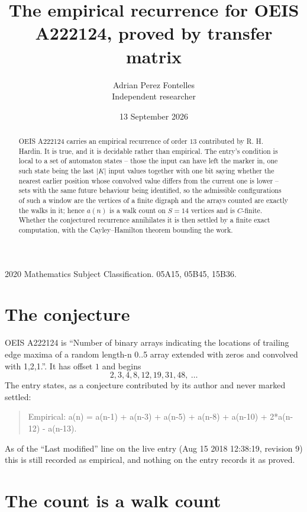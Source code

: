 \documentclass[11pt,a4paper]{article}
\title{The empirical recurrence for OEIS A222124, proved by transfer matrix}
\author{Adrian Perez Fontelles\\ \small Independent researcher}
\date{13 September 2026}
\theoremstyle{plain}
\theoremstyle{definition}
\begin{document}
\maketitle

\begin{abstract}
OEIS A222124 carries an empirical recurrence of order $13$ contributed by R. H. Hardin. It is
true, and it is decidable rather than empirical. The entry's condition is local to a set of automaton states -- those the input can have left the marker in, one such state being the last $|K|$ input values together with one bit saying whether the nearest earlier position whose convolved value differs from the current one is lower -- sets with the same future behaviour being identified, so
the admissible configurations of such a window are the vertices of a finite digraph and the
arrays counted are exactly the walks in it; hence $a(n)$ is a walk count on $S=14$ vertices
and is $C$-finite. Whether the conjectured recurrence annihilates it is then settled by a
finite exact computation, with the Cayley--Hamilton theorem bounding the work.
\end{abstract}

\noindent\small 2020 Mathematics Subject Classification. 05A15, 05B45, 15B36.\normalsize

\section{The conjecture}

OEIS A222124 is ``Number of binary arrays indicating the locations of trailing edge maxima of a random length-n 0..5 array extended with zeros and convolved with 1,2,1.''. It has offset $1$ and begins
\[
2, 3, 4, 8, 12, 19, 31, 48,\ \dots
\]
The entry states, as a conjecture contributed by its author and never marked settled:
\begin{quote}
Empirical: a(n) = a(n-1) + a(n-3) + a(n-5) + a(n-8) + a(n-10) + 2*a(n-12) - a(n-13).
\end{quote}
As of the ``Last modified'' line on the live entry (Aug 15 2018 12:38:19, revision 9) this is still
recorded as empirical, and nothing on the entry records it as proved.

\section{The count is a walk count}
\end{document}
